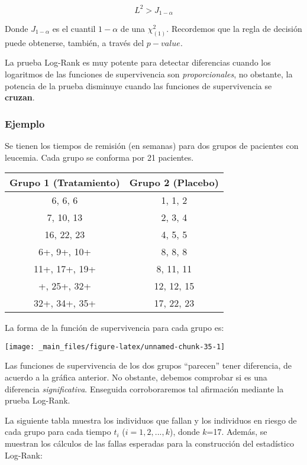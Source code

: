 \documentclass[
  a4paper,
  oneside,
  openany]{book}
\begin{document}
\[
L^2>J_{1-\alpha}
\]

Donde \(J_{1-\alpha}\) es el cuantil \(1-\alpha\) de una \(\chi^2_{(1)}\). Recordemos que la regla de decisión puede obtenerse, también, a través del \(p-value\).

La prueba Log-Rank es muy potente para detectar diferencias cuando los logaritmos de las funciones de supervivencia son \emph{proporcionales}, no obstante, la potencia de la prueba disminuye cuando las funciones de supervivencia se \textbf{cruzan}.

\hypertarget{ejemplo-16}{%
\subsubsection*{Ejemplo}\label{ejemplo-16}}


Se tienen los tiempos de remisión (en semanas) para dos grupos de pacientes con leucemia. Cada grupo se conforma por 21 pacientes.

\begin{table}
\centering
\begin{tabular}{cc}
\toprule
Grupo 1 (Tratamiento) & Grupo 2 (Placebo)\\
\midrule
6,  6, 6 & 1, 1, 2\\
7, 10, 13 & 2, 3, 4\\
16, 22, 23 & 4, 5, 5\\
6+, 9+, 10+ & 8, 8, 8\\
11+, 17+, 19+ & 8, 11, 11\\
\addlinespace
20+, 25+, 32+ & 12, 12, 15\\
32+, 34+, 35+ & 17, 22, 23\\
\bottomrule
\end{tabular}
\end{table}

La forma de la función de supervivencia para cada grupo es:

\begin{center}\texttt{[image: \_main\_files/figure-latex/unnamed-chunk-35-1]} \end{center}

Las funciones de supervivencia de los dos grupos ``parecen'' tener diferencia, de acuerdo a la gráfica anterior. No obstante, debemos comprobar si es una diferencia \emph{significativa}. Enseguida corroboraremos tal afirmación mediante la prueba Log-Rank.

La siguiente tabla muestra los individuos que fallan y los individuos en riesgo de cada grupo para cada tiempo \(t_i\) (\(i=1,2,...,k\)), donde \(k\)=17. Además, se muestran los cálculos de las fallas esperadas para la construcción del estadístico Log-Rank:
\end{document}
